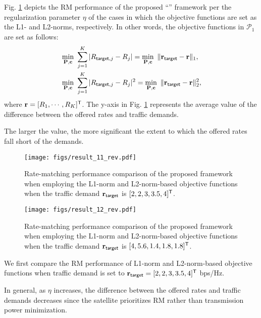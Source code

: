 \documentclass[draftclsnofoot, onecolumn, comsoc, 12pt]{IEEEtran}
\begin{document}
Fig. \ref{result_13} depicts the RM performance of the proposed ``{}'' framework per the regularization parameter $\eta$ of the cases in which the objective functions are set as the L1- and L2-norms, respectively. In other words, the objective functions in $\mathscr{P}_1$ are set as follows:
\begin{align}
\label{L1norm}
  &\min_{\mathbf{P}, \mathbf{c}} \,\, {\sum_{j=1}^{K} \vert R_{{\sf target}{,j}}-R_{j} \vert } = \min_{\mathbf{P}, \mathbf{c}} \,\, {\Vert \mathbf{r}_{{\sf target}}-\mathbf{r} \Vert_{1} },\\
\label{L2norm}
  &\min_{\mathbf{P}, \mathbf{c}} \,\, {\sum_{j=1}^{K} \vert R_{{\sf target}{,j}}-R_{j} \vert ^{2}}  = \min_{\mathbf{P}, \mathbf{c}} \,\, {\Vert \mathbf{r}_{{\sf target}}-\mathbf{r} \Vert_{2}^{2} },
\end{align}
where $\mathbf{r} = [R_{1},\cdots,R_{K}]^{\sf{T}}$. 
The y-axis in Fig. \ref{result_13} represents the average value of the difference between the offered rates and traffic demands. { The larger the value, the more significant the extent to which the offered rates fall short of the demands. 


\begin{figure}[!t]
\centering
 		\texttt{[image: figs/result\_11\_rev.pdf]}
 		\caption{{Rate-matching performance comparison of the proposed framework when employing the L1-norm and L2-norm-based objective functions when the traffic demand $\mathbf{r}_{\sf{target}}$ is $[2, 2, 3, 3.5, 4]^{\sf{T}}$.}}
    	\label{result_13} %
\end{figure}

\begin{figure}[!t]
\centering
 		\texttt{[image: figs/result\_12\_rev.pdf]}
 		\caption{{Rate-matching performance comparison of the proposed framework when employing the L1-norm and L2-norm-based objective functions when the traffic demand $\mathbf{r}_{\sf{target}}$ is $[4, 5.6, 1.4, 1.8, 1.8]^{\sf{T}}$.}}
    	\label{result_14} %
\end{figure}

We first compare the RM performance of L1-norm and
L2-norm-based objective functions when traffic demand is set to $\mathbf{r}_{\sf{target}}=[2, 2, 3, 3.5, 4]^{\sf{T}}$ bps/Hz.} In general, as $\eta$ increases, the difference between the offered rates and traffic demands decreases since the satellite prioritizes RM rather than transmission power minimization.
\end{document}
